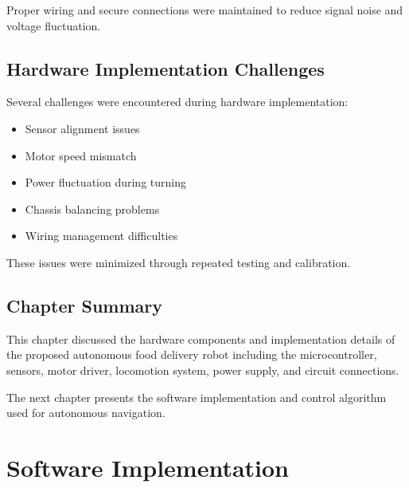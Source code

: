 \documentclass[12pt,a4paper,oneside]{report}
\begin{document}
Proper wiring and secure connections were maintained to reduce signal noise and voltage fluctuation.


\section{Hardware Implementation Challenges}

Several challenges were encountered during hardware implementation:

\begin{itemize}

\item Sensor alignment issues

\item Motor speed mismatch

\item Power fluctuation during turning

\item Chassis balancing problems

\item Wiring management difficulties

\end{itemize}

These issues were minimized through repeated testing and calibration.


\section{Chapter Summary}

This chapter discussed the hardware components and implementation details of the proposed autonomous food delivery robot including the microcontroller, sensors, motor driver, locomotion system, power supply, and circuit connections.

The next chapter presents the software implementation and control algorithm used for autonomous navigation.



\chapter{Software Implementation}
\end{document}
